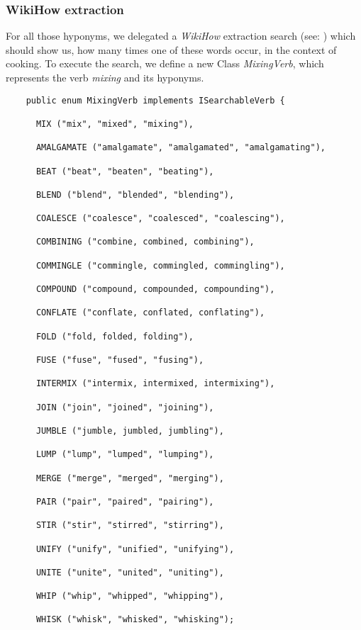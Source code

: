  \subsubsection{WikiHow extraction}
  For all those hyponyms, we delegated a \textit{WikiHow} extraction search (see: ) which should show us, how many times one of these words occur, in the context of cooking.
	To execute the search, we define a new Class \textit{MixingVerb}, which represents the verb \textit{mixing} and its hyponyms.
  \begin{lstlisting}
    public enum MixingVerb implements ISearchableVerb {

      MIX ("mix", "mixed", "mixing"),

      AMALGAMATE ("amalgamate", "amalgamated", "amalgamating"),

      BEAT ("beat", "beaten", "beating"),

      BLEND ("blend", "blended", "blending"),

      COALESCE ("coalesce", "coalesced", "coalescing"),

      COMBINING ("combine, combined, combining"),

      COMMINGLE ("commingle, commingled, commingling"),

      COMPOUND ("compound, compounded, compounding"),

      CONFLATE ("conflate, conflated, conflating"),

      FOLD ("fold, folded, folding"),

      FUSE ("fuse", "fused", "fusing"),

      INTERMIX ("intermix, intermixed, intermixing"),

      JOIN ("join", "joined", "joining"),

      JUMBLE ("jumble, jumbled, jumbling"),

      LUMP ("lump", "lumped", "lumping"),

      MERGE ("merge", "merged", "merging"),

      PAIR ("pair", "paired", "pairing"),

      STIR ("stir", "stirred", "stirring"),

      UNIFY ("unify", "unified", "unifying"),

      UNITE ("unite", "united", "uniting"),

      WHIP ("whip", "whipped", "whipping"),

      WHISK ("whisk", "whisked", "whisking");
  \end{lstlisting}

